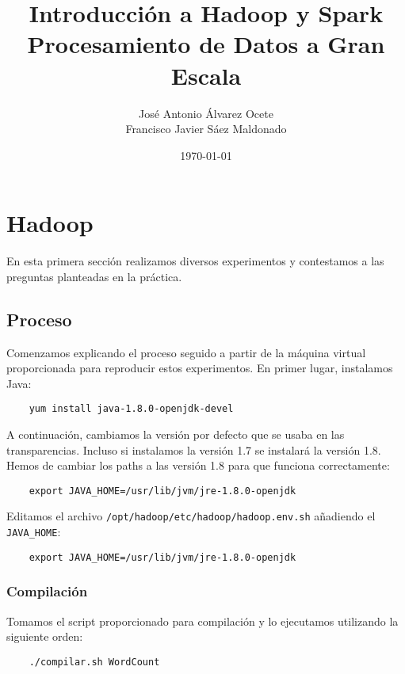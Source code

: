 \documentclass[11pt]{article}
\author{José Antonio Álvarez Ocete\\ Francisco Javier Sáez Maldonado}
\date{\today}
\title{Introducción a Hadoop y Spark\\\medskip
\large Procesamiento de Datos a Gran Escala}
\def\inline{\lstinline[basicstyle=\ttfamily,keywordstyle={}]}
\begin{document}
\maketitle

\tableofcontents

\section{Hadoop}

En esta primera sección realizamos diversos experimentos y contestamos a las preguntas planteadas en la práctica.

\subsection{Proceso}

Comenzamos explicando el proceso seguido a partir de la máquina virtual proporcionada para reproducir estos experimentos. En primer lugar, instalamos Java:

\begin{verbatim}
	yum install java-1.8.0-openjdk-devel
\end{verbatim}

A continuación, cambiamos la versión por defecto que se usaba en las transparencias. Incluso si instalamos la versión 1.7 se instalará la versión 1.8. Hemos de cambiar los paths a las versión 1.8 para que funciona correctamente:

\begin{verbatim}
	export JAVA_HOME=/usr/lib/jvm/jre-1.8.0-openjdk
\end{verbatim}

Editamos el archivo \inline{/opt/hadoop/etc/hadoop/hadoop.env.sh} añadiendo el \inline{JAVA_HOME}:

\begin{verbatim}
	export JAVA_HOME=/usr/lib/jvm/jre-1.8.0-openjdk
\end{verbatim}

\subsubsection*{ Compilación}

Tomamos el script proporcionado para compilación y lo ejecutamos utilizando la siguiente orden:

\begin{verbatim}
	./compilar.sh WordCount
\end{verbatim}
\end{document}
